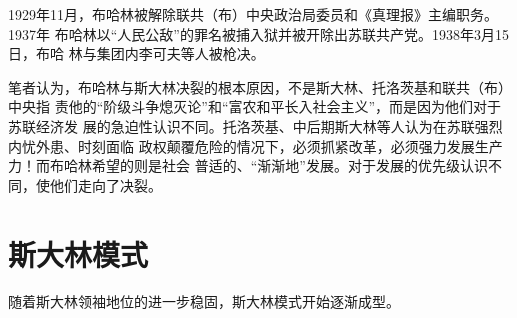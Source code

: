 \begin{enumerate}
  1929年11月，布哈林被解除联共（布）中央政治局委员和《真理报》主编职务。1937年
  布哈林以“人民公敌”的罪名被捕入狱并被开除出苏联共产党。1938年3月15日，布哈
  林与集团内李可夫等人被枪决。

  笔者认为，布哈林与斯大林决裂的根本原因，不是斯大林、托洛茨基和联共（布）中央指
  责他的``阶级斗争熄灭论''和``富农和平长入社会主义''，而是因为他们对于苏联经济发
  展的急迫性认识不同。托洛茨基、中后期斯大林等人认为在苏联强烈内忧外患、时刻面临
  政权颠覆危险的情况下，必须抓紧改革，必须强力发展生产力！而布哈林希望的则是社会
  普适的、``渐渐地''发展。对于发展的优先级认识不同，使他们走向了决裂。
\end{enumerate}

\section{斯大林模式}

随着斯大林领袖地位的进一步稳固，斯大林模式开始逐渐成型。

